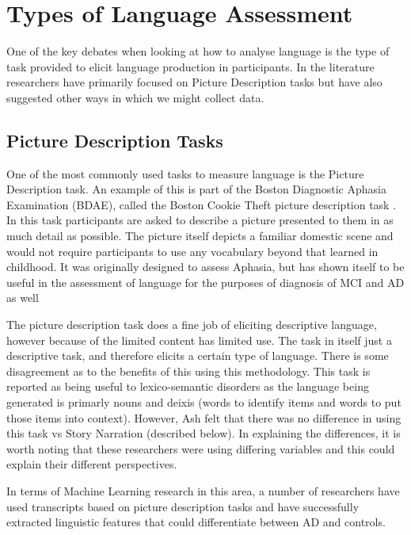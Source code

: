 \documentclass[a4paper]{article}
\begin{document}
\section {Types of Language Assessment}
One of the key debates when looking at how to analyse language is the type of task provided to elicit language production in participants. In the literature researchers have primarily focused on Picture Description tasks but have also suggested other ways in which we might collect data. \newline
\par
\subsection{Picture Description Tasks}
One of the most commonly used tasks to measure language is the Picture Description task. An example of this is part of the Boston Diagnostic Aphasia Examination (BDAE), called the Boston Cookie Theft picture description task \cite{Kaplan2010}. In this task participants are asked to describe a picture presented to them in as much detail as possible. The picture itself depicts a familiar domestic scene and would not require participants to use any vocabulary beyond that learned in childhood. It was originally designed to assess Aphasia, but has shown itself to be useful in the assessment of language for the purposes of diagnosis of MCI and AD as well \cite{Giles1996}\newline
\par
The picture description task does a fine job of eliciting descriptive language, however because of the limited content has limited use. The task in itself just a descriptive task, and therefore elicits a certain type of language. There is some disagreement as to the benefits of this using this methodology. This task is reported as being useful to lexico-semantic disorders \cite{Boschi2017, Sajjadi2012} as the language being generated is primarly nouns and deixis (words to identify items and words to put those items into context). However, Ash \cite{Ash2012}felt that there was no difference in using this task vs Story Narration (described below). In explaining the differences, it is worth noting that these researchers were using differing variables and this could explain their different perspectives. \newline
\par
In terms of Machine Learning research in this area, a number of researchers have used transcripts based on picture description tasks \cite{Zimmerer2016, Orimaye2017, Mueller2018a, Fraser2015} and have successfully extracted linguistic features that could differentiate between AD and controls.\newline
\par
\end{document}
